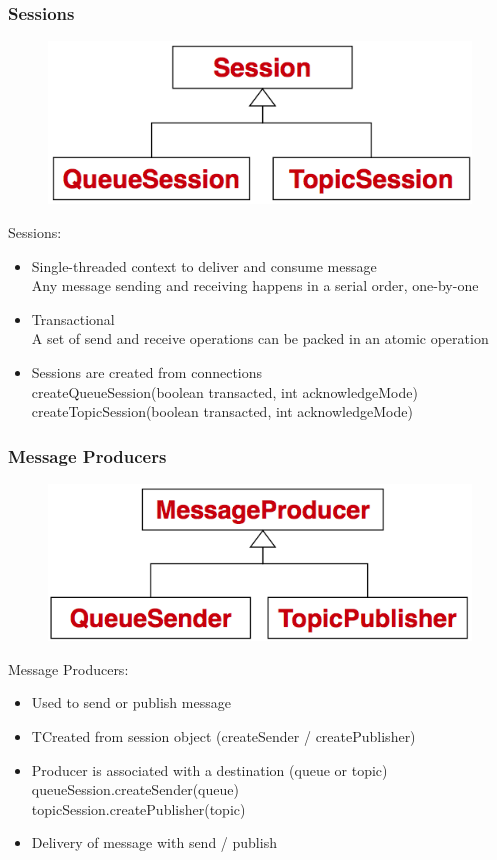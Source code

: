 \documentclass[10pt]{article}
\begin{document}
\subsubsection{Sessions}
\begin{figure}
	\centering
	\includegraphics[scale=0.2]{images/jms-api-session.png}%
\end{figure}
Sessions:
\begin{itemize}
	\item Single-threaded context to deliver and consume message \\
		Any message sending and receiving happens in a serial order, one-by-one
	\item Transactional \\
		A set of send and receive operations can be packed in an atomic operation
	\item Sessions are created from connections \\
		createQueueSession(boolean transacted, int acknowledgeMode)	 \\
		createTopicSession(boolean transacted, int acknowledgeMode)
\end{itemize}

\subsubsection{Message Producers}
\begin{figure}
	\centering
	\includegraphics[scale=0.2]{images/jms-api-message-producer.png}%
\end{figure}
Message Producers:
\begin{itemize}
	\item Used to send or publish message
	\item TCreated from session object (createSender / createPublisher)
	\item Producer is associated with a destination (queue or topic) \\
		queueSession.createSender(queue)	 \\
		topicSession.createPublisher(topic) 
	\item Delivery of message with send / publish
\end{itemize}
\end{document}
